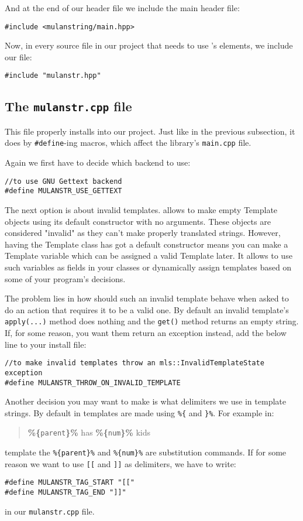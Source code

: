And at the end of our header file we include the \mulan{} main header file:
\begin{verbatim}
#include <mulanstring/main.hpp>
\end{verbatim}

Now, in every source file in our project that needs to use \mulan{}'s elements, we include our file:
\begin{verbatim}
#include "mulanstr.hpp"
\end{verbatim}

\subsection{The \texttt{mulanstr.cpp} file}
This file properly installs \mulan{} into our project. 
Just like in the previous subsection, it does by \verb+#define+-ing macros, which affect the library's \verb+main.cpp+ file.

Again we first have to decide which backend to use:
\begin{verbatim}
//to use GNU Gettext backend
#define MULANSTR_USE_GETTEXT
\end{verbatim}

The next option is about invalid templates. \mulan{} allows to make empty Template objects using its default constructor with no arguments.
These objects are considered "invalid" as they can't make properly translated strings. 
However, having the Template class has got a default constructor means you can make a Template variable which can be assigned a valid Template later.
It allows to use such variables as fields in your classes or dynamically assign templates based on some of your program's decisions. 

The problem lies in how should such an invalid template behave when asked to do an action that requires it to be a valid one.
By default an invalid template's \verb+apply(...)+ method does nothing and the \verb+get()+ method returns an empty string.
If, for some reason, you want them return an exception instead, add the below line to your install file:
\begin{verbatim}
//to make invalid templates throw an mls::InvalidTemplateState exception
#define MULANSTR_THROW_ON_INVALID_TEMPLATE
\end{verbatim}

Another decision you may want to make is what delimiters we use in template strings. 
By default in \mulan{} templates are made using \verb+%{+ and \verb+}%+. For example in:
\begin{quotation}
	\textbf{\%\{}\texttt{parent}\textbf{\}\%} has \textbf{\%\{}\texttt{num}\textbf{\}\%} kids
\end{quotation}
template the \verb+%{parent}%+ and \verb+%{num}%+ are substitution commands. 
If for some reason we want to use \verb+[[+ and \verb+]]+ as delimiters, we have to write:
\begin{verbatim}
#define MULANSTR_TAG_START "[["
#define MULANSTR_TAG_END "]]"
\end{verbatim} in our \texttt{mulanstr.cpp} file.

